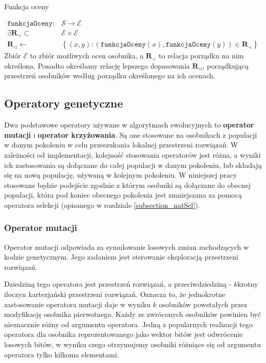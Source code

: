 \documentclass[twoside]{iisthesis}
\newcommand{\important}{\mathcal}
\newcommand{\R}{\mathbf{R}}
\newcommand{\minorityEvalRel}{{\R}_{\prec}}
\newcommand{\minoritySpecimenRel}{{\R}_{\lhd}}
\newcommand{\param}{\mathtt}
\begin{document}
\begin{signature}
	\caption{Funkcja oceny \label{signature_eval}}
	\begin{align}
		\param{funkcjaOceny}: &\important{S} \rightarrow \important{E} \\
		\exists \minorityEvalRel \subset &\important{E} \times \important{E} \\
		\minoritySpecimenRel \gets &\left\{ (x, y): (\param{funkcjaOceny}(x), \param{funkcjaOceny}(y)) \in \minorityEvalRel \right\}
	\end{align}
	Zbiór $\important{E}$ to zbiór możliwych ocen osobnika, 
	a $\minorityEvalRel$ to relacja porządku na nim określona. Ponadto określamy relację lepszego dopasowania $\minoritySpecimenRel$, porządkującą przestrzeń osobników według porządku określonego na ich ocenach. 
\end{signature}

\subsection{Operatory genetyczne}

Dwa podstawowe operatory używane w algorytmach ewolucyjnych to \textbf{operator mutacji} i \textbf{operator krzyżowania}. Są one stosowane na osobnikach z populacji w danym pokoleniu w celu przeszukania lokalnej przestrzeni rozwiązań. W zależności od implementacji, kolejność stosowania operatorów jest różna, a wyniki ich zastosowania są dołączane do całej populacji w danym pokoleniu, lub składają się na nową populację, używaną w kolejnym pokoleniu. W niniejszej pracy stosowane będzie podejście zgodnie z którym osobniki są dołączane do obecnej populacji, która pod koniec obecnego pokolenia jest zmniejszana za pomocą operatora selekcji (opisanego w rozdziale \ref{subsection_natSel}).

\subsubsection{Operator mutacji}
Operator mutacji odpowiada za symulowanie losowych zmian zachodzących w kodzie genetycznym. Jego zadaniem jest sterowanie eksploracją przestrzeni rozwiązań.

Dziedziną tego operatora jest przestrzeń rozwiązań, a przeciwdziedziną - $k$krotny iloczyn kartezjański przestrzeni rozwiązań. Oznacza to, że jednokrotne zastosowanie operatora mutacji daje w wyniku $k$ osobników powstałych przez modyfikację osobnika pierwotnego. Każdy ze zwróconych osobników powinien być nieznacznie różny od argumentu operatora. Jedną z popularnych realizacji tego operatora dla osobnika reprezentowanego jako wektor bitów jest odwrócenie losowych bitów, w wyniku czego otrzymujemy osobniki różniące się od argumentu operatora tylko kilkoma elementami.
\end{document}
